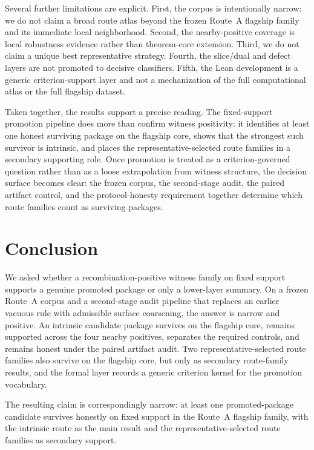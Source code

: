 \documentclass[11pt]{article}
\theoremstyle{definition}
\begin{document}
Several further limitations are explicit. First, the corpus is intentionally narrow: we do not claim a broad route atlas beyond the frozen Route~A flagship family and its immediate local neighborhood. Second, the nearby-positive coverage is local robustness evidence rather than theorem-core extension. Third, we do not claim a unique best representative strategy. Fourth, the slice/dual and defect layers are not promoted to decisive classifiers. Fifth, the Lean development is a generic criterion-support layer and not a mechanization of the full computational atlas or the full flagship dataset.

Taken together, the results support a precise reading. The fixed-support promotion pipeline does more than confirm witness positivity: it identifies at least one honest surviving package on the flagship core, shows that the strongest such survivor is intrinsic, and places the representative-selected route families in a secondary supporting role. Once promotion is treated as a criterion-governed question rather than as a loose extrapolation from witness structure, the decision surface becomes clear: the frozen corpus, the second-stage audit, the paired artifact control, and the protocol-honesty requirement together determine which route families count as surviving packages.
 \section{Conclusion}\label{sec:conclusion}

We asked whether a recombination-positive witness family on fixed support supports a genuine promoted package or only a lower-layer summary. On a frozen Route~A corpus and a second-stage audit pipeline that replaces an earlier vacuous rule with admissible surface coarsening, the answer is narrow and positive. An intrinsic candidate package survives on the flagship core, remains supported across the four nearby positives, separates the required controls, and remains honest under the paired artifact audit. Two representative-selected route families also survive on the flagship core, but only as secondary route-family results, and the formal layer records a generic criterion kernel for the promotion vocabulary.

The resulting claim is correspondingly narrow: at least one promoted-package candidate survives honestly on fixed support in the Route~A flagship family, with the intrinsic route as the main result and the representative-selected route families as secondary support.
 
\end{document}

